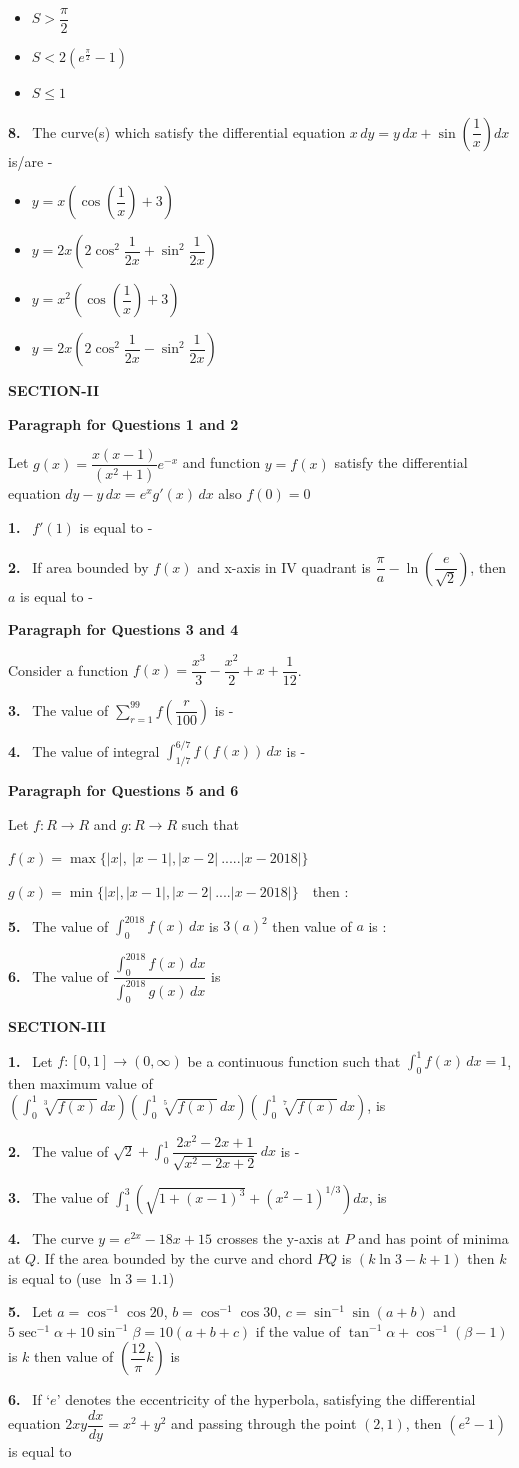 \documentclass[10pt]{extarticle}
\newcommand{\sect}[1]{\par\smallskip\noindent\textbf{#1}\par}
\newcommand{\qn}[1]{\par\smallskip\noindent\textbf{#1.}~}
\newcommand{\paraq}[2]{\par\smallskip\noindent\textbf{Paragraph for Questions #1 and #2}\par}
\newenvironment{qoptions}{\begin{itemize}[leftmargin=1.8em,itemsep=1pt,topsep=2pt,label={}]}{\end{itemize}}
\newcommand{\opt}[2]{\item[(#1)] #2}
\begin{document}
\begin{multicols}{2}
\begin{qoptions}
\opt{B}{$S>\dfrac\pi2$}
\opt{C}{$S<2\left(e^{\frac\pi2}-1\right)$}
\opt{D}{$S\le1$}
\end{qoptions}
\qn{8} The curve(s) which satisfy the differential equation $x\,dy=y\,dx+\sin\left(\dfrac1x\right)dx$ is/are -
\begin{qoptions}
\opt{A}{$y=x\left(\cos\left(\dfrac1x\right)+3\right)$}
\opt{B}{$y=2x\left(2\cos^2\dfrac1{2x}+\sin^2\dfrac1{2x}\right)$}
\opt{C}{$y=x^2\left(\cos\left(\dfrac1x\right)+3\right)$}
\opt{D}{$y=2x\left(2\cos^2\dfrac1{2x}-\sin^2\dfrac1{2x}\right)$}
\end{qoptions}
\sect{SECTION-II}
\paraq{1}{2}
Let $g(x)=\dfrac{x(x-1)}{(x^2+1)}e^{-x}$ and function $y=f(x)$ satisfy the differential equation $dy-y\,dx=e^xg'(x)\,dx$ also $f(0)=0$
\qn{1} $f'(1)$ is equal to -
\qn{2} If area bounded by $f(x)$ and x-axis in IV quadrant is $\dfrac\pi a-\ln\left(\dfrac e{\sqrt2}\right)$, then $a$ is equal to -
\paraq{3}{4}
Consider a function $f(x)=\dfrac{x^3}{3}-\dfrac{x^2}{2}+x+\dfrac1{12}$.
\qn{3} The value of $\displaystyle\sum_{r=1}^{99}f\left(\dfrac r{100}\right)$ is -
\qn{4} The value of integral $\displaystyle\int_{1/7}^{6/7}f(f(x))\,dx$ is -
\paraq{5}{6}
Let $f:R\to R$ and $g:R\to R$ such that\par
$f(x)=\max\{|x|,\ |x-1|,|x-2|\ .....|x-2018|\}$\par
$g(x)=\min\{|x|,|x-1|,|x-2|\ ....|x-2018|\}$\ \ then :
\qn{5} The value of $\displaystyle\int_0^{2018}f(x)\,dx$ is $3(a)^2$ then value of $a$ is :
\qn{6} The value of $\dfrac{\displaystyle\int_0^{2018}f(x)\,dx}{\displaystyle\int_0^{2018}g(x)\,dx}$ is
\sect{SECTION-III}
\qn{1} Let $f:[0,1]\to(0,\infty)$ be a continuous function such that $\displaystyle\int_0^1f(x)\,dx=1$, then maximum value of $\left(\displaystyle\int_0^1\sqrt[3]{f(x)}\,dx\right)\left(\displaystyle\int_0^1\sqrt[5]{f(x)}\,dx\right)\left(\displaystyle\int_0^1\sqrt[7]{f(x)}\,dx\right)$, is
\qn{2} The value of $\sqrt2+\displaystyle\int_0^1\dfrac{2x^2-2x+1}{\sqrt{x^2-2x+2}}\,dx$ is -
\qn{3} The value of $\displaystyle\int_1^3\left(\sqrt{1+(x-1)^3}+(x^2-1)^{1/3}\right)dx$, is
\qn{4} The curve $y=e^{2x}-18x+15$ crosses the y-axis at $P$ and has point of minima at $Q$. If the area bounded by the curve and chord $PQ$ is $(k\ln3-k+1)$ then $k$ is equal to (use $\ln3=1.1$)
\qn{5} Let $a=\cos^{-1}\cos20$, $b=\cos^{-1}\cos30$, $c=\sin^{-1}\sin(a+b)$ and $5\sec^{-1}\alpha+10\sin^{-1}\beta=10(a+b+c)$ if the value of $\tan^{-1}\alpha+\cos^{-1}(\beta-1)$ is $k$ then value of $\left(\dfrac{12}{\pi}k\right)$ is
\qn{6} If `$e$' denotes the eccentricity of the hyperbola, satisfying the differential equation $2xy\dfrac{dx}{dy}=x^2+y^2$ and passing through the point $(2,1)$, then $(e^2-1)$ is equal to
\end{multicols}
\end{document}
